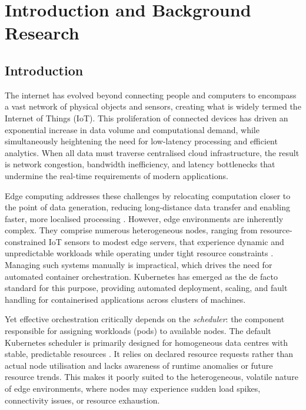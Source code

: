 \chapter{Introduction and Background Research}
\label{chapter1}

\section{Introduction}

The internet has evolved beyond connecting people and computers to encompass a vast network of physical objects and sensors, creating what is widely termed the Internet of Things (IoT). This proliferation of connected devices has driven an exponential increase in data volume and computational demand, while simultaneously heightening the need for low-latency processing and efficient analytics. When all data must traverse centralised cloud infrastructure, the result is network congestion, bandwidth inefficiency, and latency bottlenecks that undermine the real-time requirements of modern applications.

Edge computing addresses these challenges by relocating computation closer to the point of data generation, reducing long-distance data transfer and enabling faster, more localised processing \cite{kim2025exploring}. However, edge environments are inherently complex. They comprise numerous heterogeneous nodes, ranging from resource-constrained IoT sensors to modest edge servers, that experience dynamic and unpredictable workloads while operating under tight resource constraints \cite{rasouli2025false}. Managing such systems manually is impractical, which drives the need for automated container orchestration. Kubernetes has emerged as the de facto standard for this purpose, providing automated deployment, scaling, and fault handling for containerised applications across clusters of machines.

Yet effective orchestration critically depends on the \textit{scheduler}: the component responsible for assigning workloads (pods) to available nodes. The default Kubernetes scheduler is primarily designed for homogeneous data centres with stable, predictable resources \cite{liu2024dynamic}. It relies on declared resource requests rather than actual node utilisation and lacks awareness of runtime anomalies or future resource trends. This makes it poorly suited to the heterogeneous, volatile nature of edge environments, where nodes may experience sudden load spikes, connectivity issues, or resource exhaustion.

